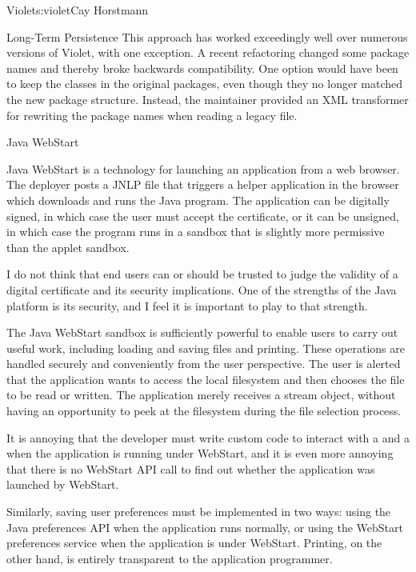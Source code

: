 \begin{aosachapter}{Violet}{s:violet}{Cay Horstmann}
\begin{aosasect1}{Long-Term Persistence}
This approach has worked exceedingly well over numerous versions of
Violet, with one exception. A recent refactoring changed
some package names and thereby broke backwards compatibility.
One option would have been to keep the classes in the original packages,
even though they no longer matched the new package structure.
Instead, the maintainer provided an XML
transformer for rewriting the package names when reading a legacy
file.

\end{aosasect1}

\begin{aosasect1}{Java WebStart}

Java WebStart is a technology for launching an application from a web
browser. The deployer posts a JNLP file that triggers a helper
application in the browser which downloads and runs the Java
program. The application can be digitally signed, in which case the
user must accept the certificate, or it can be unsigned, in which case
the program runs in a sandbox that is slightly more permissive than
the applet sandbox.

I do not think that end users can or should be trusted to judge the
validity of a digital certificate and its security implications. One
of the strengths of the Java platform is its security, and I feel it
is important to play to that strength.

The Java WebStart sandbox is sufficiently powerful to enable users to
carry out useful work, including loading and saving files and
printing.  These operations are handled securely and conveniently from
the user perspective. The user is alerted that the application wants
to access the local filesystem and then chooses the file to be read
or written. The application merely receives a stream object, without
having an opportunity to peek at the filesystem during the file
selection process.

It is annoying that the developer must write
custom code to interact with a  and a
 when the application is running under WebStart,
and it is even more annoying that there is no WebStart API call to
find out whether the application was launched by WebStart.

Similarly, saving user preferences must be implemented in two ways:
using the Java preferences API when the application runs normally, or
using the WebStart preferences service when the application is under
WebStart. Printing, on the other hand, is entirely transparent to the
application programmer.


\end{aosasect1}
\end{aosachapter}
